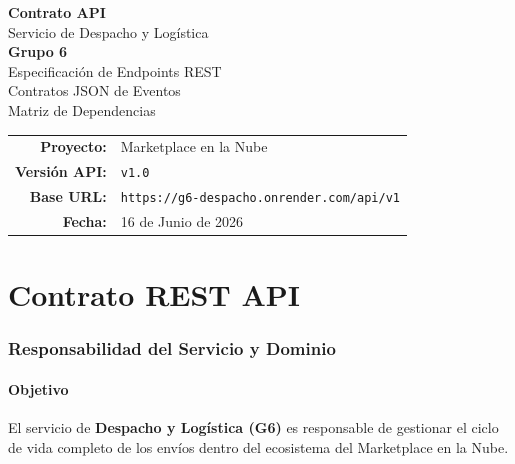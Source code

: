 \documentclass[11pt, a4paper]{article}
\begin{document}
\begin{titlepage}
\centering
\vspace*{2.5cm}

{\Huge\bfseries\textcolor{primary}{Contrato API}}\\[0.3cm]
{\LARGE\textcolor{primary!70}{Servicio de Despacho y Logística}}\\[0.5cm]
{\Large\textcolor{accent}{\textbf{Grupo 6}}}\\[2cm]

{\large Especificación de Endpoints REST}\\[0.2cm]
{\large Contratos JSON de Eventos}\\[0.2cm]
{\large Matriz de Dependencias}\\[3cm]

\begin{tabular}{rl}
  \textbf{Proyecto:}     & Marketplace en la Nube \\
  \textbf{Versión API:}  & \texttt{v1.0} \\
  \textbf{Base URL:}     & \texttt{https://g6-despacho.onrender.com/api/v1} \\
  \textbf{Fecha:}        & 16 de Junio de 2026 \\
\end{tabular}

\vfill



\end{titlepage}

\tableofcontents
\newpage


\part{Contrato REST API}

\section{Responsabilidad del Servicio y Dominio}

\subsection{Objetivo}

El servicio de \textbf{Despacho y Logística (G6)} es responsable de gestionar el ciclo de vida completo de los envíos dentro del ecosistema del Marketplace en la Nube.
\end{document}
